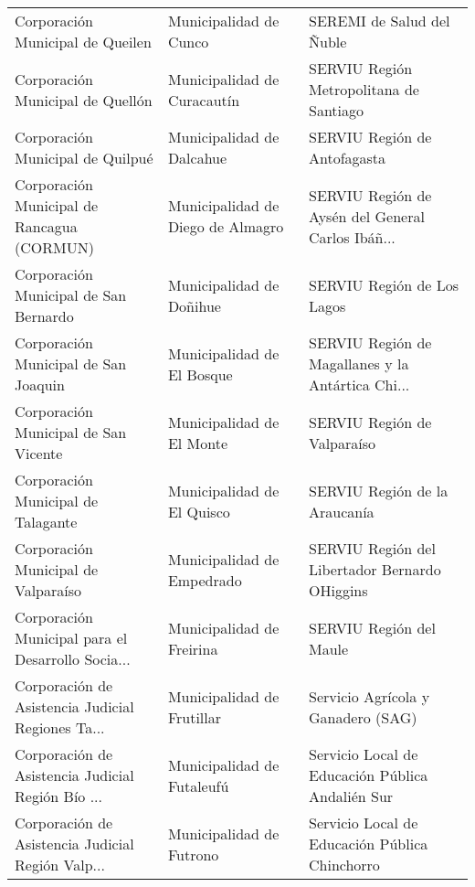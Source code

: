 \documentclass[11pt]{article}
\begin{document}
\begin{longtable}{ p{5cm} | p{5cm} | p{5cm} }
                  Corporación Municipal de Queilen &                             Municipalidad de Cunco &                          SEREMI de Salud del Ñuble \\
                  Corporación Municipal de Quellón &                        Municipalidad de Curacautín &            SERVIU Región Metropolitana de Santiago \\
                  Corporación Municipal de Quilpué &                          Municipalidad de Dalcahue &                       SERVIU Región de Antofagasta \\
        Corporación Municipal de Rancagua (CORMUN) &                  Municipalidad de Diego de Almagro &  SERVIU Región de Aysén del General Carlos Ibáñ... \\
             Corporación Municipal de San Bernardo &                           Municipalidad de Doñihue &                         SERVIU Región de Los Lagos \\
              Corporación Municipal de San Joaquin &                         Municipalidad de El Bosque &  SERVIU Región de Magallanes y la Antártica Chi... \\
              Corporación Municipal de San Vicente &                          Municipalidad de El Monte &                        SERVIU Región de Valparaíso \\
                Corporación Municipal de Talagante &                         Municipalidad de El Quisco &                      SERVIU Región de la Araucanía \\
               Corporación Municipal de Valparaíso &                         Municipalidad de Empedrado &     SERVIU Región del Libertador Bernardo OHiggins \\
 Corporación Municipal para el Desarrollo Socia... &                          Municipalidad de Freirina &                            SERVIU Región del Maule \\
 Corporación de Asistencia Judicial Regiones Ta... &                         Municipalidad de Frutillar &                 Servicio Agrícola y Ganadero (SAG) \\
 Corporación de Asistencia Judicial Región Bío ... &                         Municipalidad de Futaleufú &   Servicio Local de Educación Pública Andalién Sur \\
 Corporación de Asistencia Judicial Región Valp... &                           Municipalidad de Futrono &     Servicio Local de Educación Pública Chinchorro \\

\end{longtable}
\end{document}
